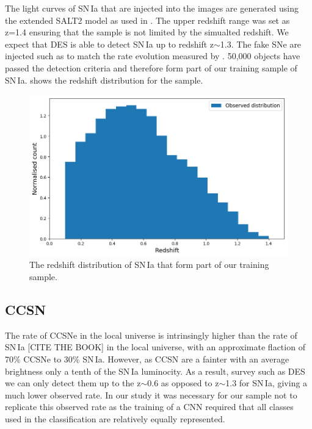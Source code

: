 The light curves of SN\,Ia that are injected into the images are generated using the extended SALT2 model as used in \citet{Betoule2014}. The upper redshift range was set as z=1.4 ensuring that the sample is not limited by the simualted redshift. We expect that DES is able to detect SN\,Ia up to redshift z$\sim$1.3. The fake SNe are injected such as to match the rate evolution measured by \citet{Perrett2012}. 50,000 objects have passed the detection criteria and therefore form part of our training sample of SN\,Ia.  shows the redshift distribution for the sample.

\begin{figure}
  \includegraphics{Figures/Chapter5/SNIa_z_dist.png}
  \caption{The redshift distribution of SN\,Ia that form part of our training sample. }
  \label{fig:IaDist}
\end{figure}

\subsection{CCSN}
The rate of CCSNe in the local universe is intrinsingly higher than the rate of SN\,Ia [CITE THE BOOK] in the local universe, with an approximate flaction of 70\% CCSNe to 30\% SN\,Ia. However, as CCSN are a fainter with an average brightness only a tenth of the SN\,Ia luminocity. As a result, survey such as DES we can only detect them up to the z$\sim$0.6 as opposed to z$\sim$1.3 for SN\,Ia, giving a much lower observed rate. In our study it was necessary for our sample not to replicate this observed rate as the training of a CNN required that all classes used in the classification are relatively equally represented.

